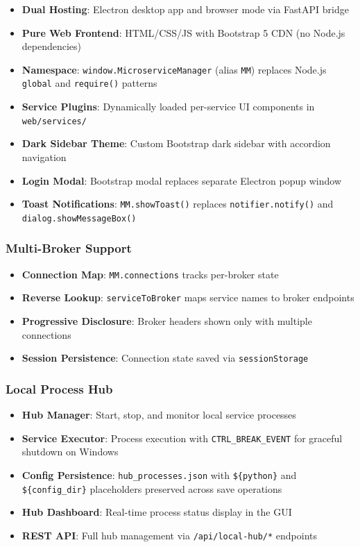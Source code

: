 \begin{itemize}
   \item \textbf{Dual Hosting}: Electron desktop app and browser mode via FastAPI bridge
   \item \textbf{Pure Web Frontend}: HTML/CSS/JS with Bootstrap 5 CDN (no Node.js dependencies)
   \item \textbf{Namespace}: \texttt{window.MicroserviceManager} (alias \texttt{MM}) replaces
         Node.js \texttt{global} and \texttt{require()} patterns
   \item \textbf{Service Plugins}: Dynamically loaded per-service UI components in \texttt{web/services/}
   \item \textbf{Dark Sidebar Theme}: Custom Bootstrap dark sidebar with accordion navigation
   \item \textbf{Login Modal}: Bootstrap modal replaces separate Electron popup window
   \item \textbf{Toast Notifications}: \texttt{MM.showToast()} replaces \texttt{notifier.notify()}
         and \texttt{dialog.showMessageBox()}
\end{itemize}

\subsubsection{Multi-Broker Support}

\begin{itemize}
   \item \textbf{Connection Map}: \texttt{MM.connections} tracks per-broker state
   \item \textbf{Reverse Lookup}: \texttt{serviceToBroker} maps service names to broker endpoints
   \item \textbf{Progressive Disclosure}: Broker headers shown only with multiple connections
   \item \textbf{Session Persistence}: Connection state saved via \texttt{sessionStorage}
\end{itemize}

\subsubsection{Local Process Hub}

\begin{itemize}
   \item \textbf{Hub Manager}: Start, stop, and monitor local service processes
   \item \textbf{Service Executor}: Process execution with \texttt{CTRL\_BREAK\_EVENT} for
         graceful shutdown on Windows
   \item \textbf{Config Persistence}: \texttt{hub\_processes.json} with \texttt{\$\{python\}} and
         \texttt{\$\{config\_dir\}} placeholders preserved across save operations
   \item \textbf{Hub Dashboard}: Real-time process status display in the GUI
   \item \textbf{REST API}: Full hub management via \texttt{/api/local-hub/*} endpoints
\end{itemize}

